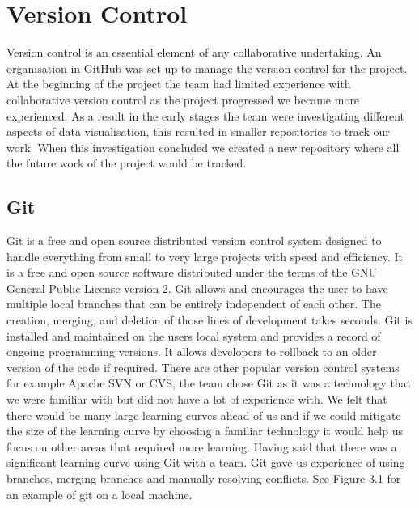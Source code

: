 \section{Version Control}
Version control is an essential element of any collaborative undertaking. An organisation in GitHub was set up to manage the version control for the project. At the beginning of the project the team had limited experience with collaborative version control as the project progressed we became more experienced. As a result in the early stages the team were investigating different aspects of data visualisation, this resulted in  smaller repositories to track our work.  When this investigation concluded we created a new repository where all the future work of the project would be tracked. 
\subsection{Git}
Git is a free and open source distributed version control system designed to handle everything from small to very large projects with speed and efficiency. It is a free and open source software distributed under the terms of the GNU General Public License version 2.
Git allows and encourages the user to have multiple local branches that can be entirely independent of each other. The creation, merging, and deletion of those lines of development takes seconds.\cite{git}
Git is installed and maintained on the users local system and provides a record of ongoing programming versions. It allows developers to rollback to an older version of the code if required.
There are other popular version control systems for example Apache SVN or CVS, the team chose Git as it was a technology that we were familiar with but did not have a lot of experience with. We felt that there would be many large learning curves ahead of us and if we could mitigate the size of the learning curve by choosing a familiar technology it would help us focus on other areas that required more learning. Having said that there was a significant learning curve using Git with a team. Git gave us experience of using branches, merging branches and manually resolving conflicts. See Figure 3.1 for an example of git on a local machine.
